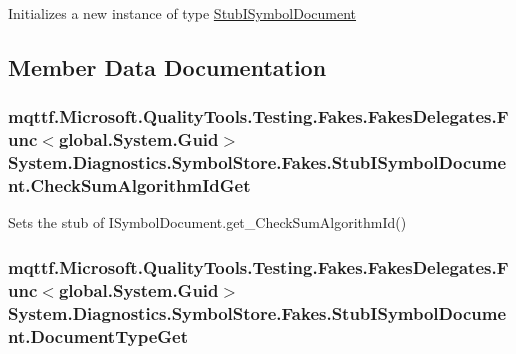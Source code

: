 Initializes a new instance of type \hyperlink{class_system_1_1_diagnostics_1_1_symbol_store_1_1_fakes_1_1_stub_i_symbol_document}{Stub\-I\-Symbol\-Document}



\subsection{Member Data Documentation}
\hypertarget{class_system_1_1_diagnostics_1_1_symbol_store_1_1_fakes_1_1_stub_i_symbol_document_ac870c7e816e7e1d820aed8c01c46c2aa}{
\subsubsection[{Check\-Sum\-Algorithm\-Id\-Get}]{\setlength{\rightskip}{0pt plus 5cm}mqttf.\-Microsoft.\-Quality\-Tools.\-Testing.\-Fakes.\-Fakes\-Delegates.\-Func$<$global.\-System.\-Guid$>$ System.\-Diagnostics.\-Symbol\-Store.\-Fakes.\-Stub\-I\-Symbol\-Document.\-Check\-Sum\-Algorithm\-Id\-Get}}\label{class_system_1_1_diagnostics_1_1_symbol_store_1_1_fakes_1_1_stub_i_symbol_document_ac870c7e816e7e1d820aed8c01c46c2aa}


Sets the stub of I\-Symbol\-Document.\-get\-\_\-\-Check\-Sum\-Algorithm\-Id()

\hypertarget{class_system_1_1_diagnostics_1_1_symbol_store_1_1_fakes_1_1_stub_i_symbol_document_aa58fd2cc26a0c92f354b88b2c4a7d0a9}{
\subsubsection[{Document\-Type\-Get}]{\setlength{\rightskip}{0pt plus 5cm}mqttf.\-Microsoft.\-Quality\-Tools.\-Testing.\-Fakes.\-Fakes\-Delegates.\-Func$<$global.\-System.\-Guid$>$ System.\-Diagnostics.\-Symbol\-Store.\-Fakes.\-Stub\-I\-Symbol\-Document.\-Document\-Type\-Get}}\label{class_system_1_1_diagnostics_1_1_symbol_store_1_1_fakes_1_1_stub_i_symbol_document_aa58fd2cc26a0c92f354b88b2c4a7d0a9}


